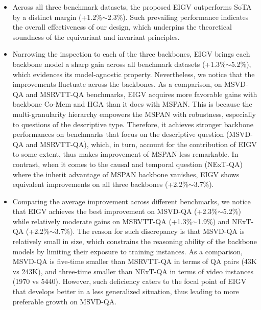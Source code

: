 \begin{itemize}[leftmargin=*]
\item Across all three benchmark datasets, the proposed EIGV outperforms SoTA by a distinct margin (+1.2\%$\sim$2.3\%). Such prevailing performance indicates the overall effectiveness of our design, which underpins the theoretical soundness of the equivariant and invariant principles. 

\item Narrowing the inspection to each of the three backbones, EIGV brings each backbone model a sharp gain across all benchmark datasets (+1.3\%$\sim$5.2\%), which evidences its model-agnostic property. 
%
Nevertheless, we notice that the improvements fluctuate across the backbones. As a comparison, on MSVD-QA and MSRVTT-QA benchmarks, EIGV acquires more favorable gains with backbone Co-Mem and HGA than it does with MSPAN. This is because the multi-granularity hierarchy empowers the MSPAN with robustness, especially to questions of the descriptive type. Therefore, it achieves stronger backbone performances on benchmarks that focus on the descriptive question (\ie MSVD-QA and MSRVTT-QA), which, in turn, account for the contribution of EIGV to some extent, thus makes improvement of MSPAN less remarkable.
In contrast, when it comes to the causal and temporal question (\ie NExT-QA) where the inherit advantage of MSPAN backbone vanishes,  EIGV shows equivalent improvements on all three backbones (+2.2\%$\sim$3.7\%). 
%

\item Comparing the average improvement across different benchmarks, we notice that EIGV achieves the best improvement on MSVD-QA (+2.3\%$\sim$5.2\%) while relatively moderate gains on MSRVTT-QA (+1.3\%$\sim$1.9\%) and NExT-QA (+2.2\%$\sim$3.7\%).
The reason for such discrepancy is that MSVD-QA is relatively small in size,
which constrains the reasoning ability of the backbone models by limiting their exposure to training instances.
As a comparison, MSVD-QA is five-time smaller than MSRVTT-QA in terms of QA pairs (43K vs 243K), and three-time smaller than NExT-QA in terms of video instances (1970 vs 5440).
However, such deficiency caters to the focal point of EIGV that develops better in a less generalized situation, thus leading to more preferable growth on MSVD-QA.
\end{itemize}

